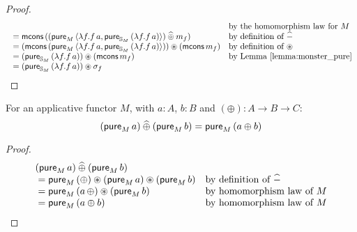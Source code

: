 \begin{proof}
$$\begin{array}{ll}
  & \mbox{by the homomorphism law for }M \\
{}= \mathsf{mcons}\,((\mathsf{pure}_M\,\langle \lambda f. f\,a, \mathsf{pure}_{\mathbb{S}_{M}}\,(\lambda f. f\,a)  \rangle) \mathbin{\widehat{\circledcirc}} m_f)
  & \mbox{by definition of }\mathbin{\widehat{-}}\\
{}= (\mathsf{mcons}\,(\mathsf{pure}_M\,\langle \lambda f. f\,a, \mathsf{pure}_{\mathbb{S}_{M}}\,(\lambda f. f\,a)  \rangle)) \circledast (\mathsf{mcons}\,m_f)
  & \mbox{by definition of }\circledast \\
{}= (\mathsf{pure}_{\mathbb{S}_{M}}\,(\lambda f. f\,a)) \circledast (\mathsf{mcons}\,m_f)
  & \mbox{by Lemma \ref{lemma:monster_pure}} \\
{} = (\mathsf{pure}_{\mathbb{S}_{M}}\,(\lambda f. f\,a)) \circledast \sigma_f
\end{array}
$$
\end{proof}


\begin{lemma}\label{lemma:pure_lift}
For an applicative functor $M$, with $a:A$, $b:B$ and $(\oplus) : A \rightarrow B \rightarrow C$:
$$
(\mathsf{pure}_M\, a) \mathbin{\widehat{\oplus}} (\mathsf{pure}_M\, b) = \mathsf{pure}_M\, (a \oplus b)
$$
\end{lemma}
\begin{proof}
$$
\begin{array}{ll}
(\mathsf{pure}_M\, a) \mathbin{\widehat{\oplus}} (\mathsf{pure}_M\, b) \\
{}= \mathsf{pure}_M\, (\oplus) \circledast (\mathsf{pure}_M\, a) \circledast (\mathsf{pure}_M\, b)
  & \mbox{by definition of }\mathbin{\widehat{-}}\\
{}= \mathsf{pure}_M\, (a\, \oplus) \circledast (\mathsf{pure}_M\, b)
  & \mbox{by homomorphism law of }M\\
{}= \mathsf{pure}_M\, (a \oplus b)
  & \mbox{by homomorphism law of }M\\
\end{array}
$$
\end{proof}

